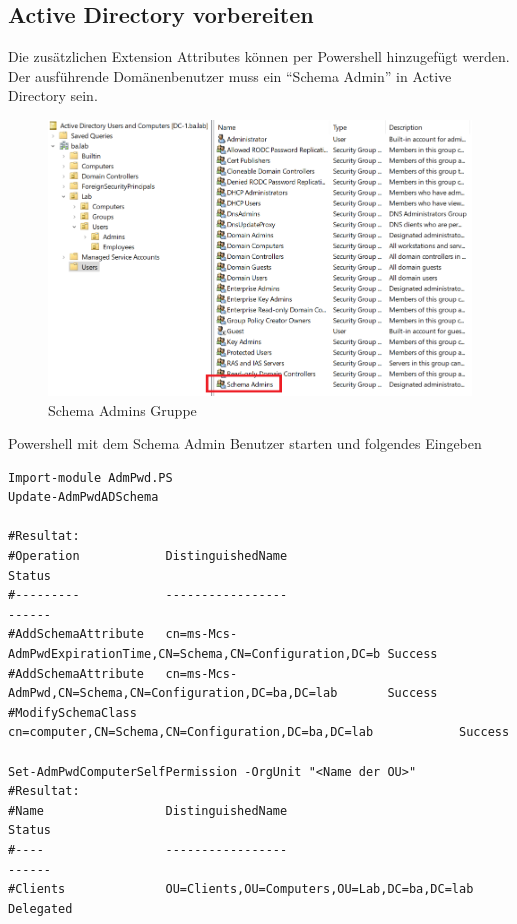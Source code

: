 \subsection{Active Directory vorbereiten}
Die zusätzlichen Extension Attributes können per Powershell hinzugefügt werden.
Der ausführende Domänenbenutzer muss ein ``Schema Admin'' in Active Directory sein.\\
\begin{figure}[H]
    \centering
    \includegraphics[width=\linewidth]{../img/LAPS/schema-admins.png}
    \caption{Schema Admins Gruppe}
\end{figure}

Powershell mit dem Schema Admin Benutzer starten und folgendes Eingeben
\begin{lstlisting}
Import-module AdmPwd.PS
Update-AdmPwdADSchema

#Resultat:
#Operation            DistinguishedName                                              Status
#---------            -----------------                                              ------
#AddSchemaAttribute   cn=ms-Mcs-AdmPwdExpirationTime,CN=Schema,CN=Configuration,DC=b Success
#AddSchemaAttribute   cn=ms-Mcs-AdmPwd,CN=Schema,CN=Configuration,DC=ba,DC=lab       Success
#ModifySchemaClass    cn=computer,CN=Schema,CN=Configuration,DC=ba,DC=lab            Success

Set-AdmPwdComputerSelfPermission -OrgUnit "<Name der OU>"
#Resultat:
#Name                 DistinguishedName                                              Status
#----                 -----------------                                              ------
#Clients              OU=Clients,OU=Computers,OU=Lab,DC=ba,DC=lab                    Delegated
\end{lstlisting}

